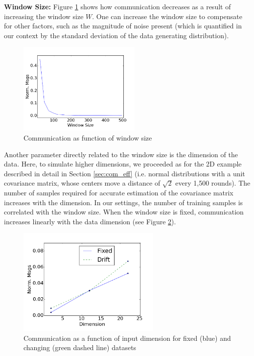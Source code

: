 \noindent\textbf{Window Size:}
Figure \ref{WindowSize} shows how communication decreases as a result
of increasing the window size $W$.  One can increase the window size to compensate 
for other factors, such as the magnitude of 
noise present (which is quantified in our context by the standard deviation of the
data generating distribution).

\begin{figure}
\centering
  \includegraphics[width=60mm]{graphics/WindowSize.png}
  \caption{Communication as function of window size }\label{WindowSize}
\end{figure}
Another parameter directly related to the window size is the dimension of the data. Here, to simulate higher dimensions, we proceeded as for the
2D example described in detail in Section \ref{sec:com_eff} (i.e. normal distributions with a unit covariance matrix, whose centers move a distance of $\sqrt{2}$ every
1,500 rounds).
The number of 
samples required for accurate estimation of the covariance matrix increases with the dimension. In our 
settings, the number of training samples is correlated with the window size. When the window size is fixed, 
communication increases linearly with the data dimension (see Figure \ref{Dimension}).
  \begin{figure}
\centering
  \includegraphics[width=70mm]{graphics/Dimension.png}
  \caption{Communication as a function of input dimension for fixed (blue) and
  changing (green  dashed line) datasets}\label{Dimension}
\end{figure}
%
%
%

